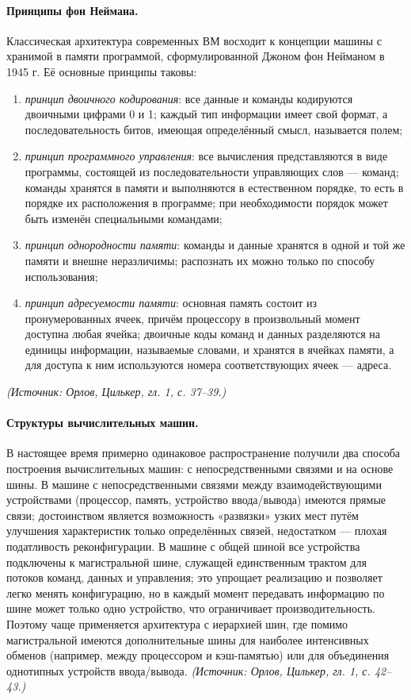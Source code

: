 \documentclass[a4paper,12pt]{article}
\begin{document}
\paragraph{Принципы фон Неймана.}
Классическая архитектура современных ВМ восходит к концепции машины с хранимой в памяти программой, сформулированной Джоном фон Нейманом в 1945 г. Её основные принципы таковы:
\begin{enumerate}[label=\arabic*)]
\item \emph{принцип двоичного кодирования}: все данные и команды кодируются двоичными цифрами 0 и 1; каждый тип информации имеет свой формат, а последовательность битов, имеющая определённый смысл, называется полем;
\item \emph{принцип программного управления}: все вычисления представляются в виде программы, состоящей из последовательности управляющих слов --- команд; команды хранятся в памяти и выполняются в естественном порядке, то есть в порядке их расположения в программе; при необходимости порядок может быть изменён специальными командами;
\item \emph{принцип однородности памяти}: команды и данные хранятся в одной и той же памяти и внешне неразличимы; распознать их можно только по способу использования;
\item \emph{принцип адресуемости памяти}: основная память состоит из пронумерованных ячеек, причём процессору в произвольный момент доступна любая ячейка; двоичные коды команд и данных разделяются на единицы информации, называемые словами, и хранятся в ячейках памяти, а для доступа к ним используются номера соответствующих ячеек --- адреса.
\end{enumerate}
\textit{(Источник: Орлов, Цилькер, гл. 1, с. 37--39.)}

\paragraph{Структуры вычислительных машин.}
В настоящее время примерно одинаковое распространение получили два способа построения вычислительных машин: с непосредственными связями и на основе шины. В машине с непосредственными связями между взаимодействующими устройствами (процессор, память, устройство ввода/вывода) имеются прямые связи; достоинством является возможность «развязки» узких мест путём улучшения характеристик только определённых связей, недостатком --- плохая податливость реконфигурации. В машине с общей шиной все устройства подключены к магистральной шине, служащей единственным трактом для потоков команд, данных и управления; это упрощает реализацию и позволяет легко менять конфигурацию, но в каждый момент передавать информацию по шине может только одно устройство, что ограничивает производительность. Поэтому чаще применяется архитектура с иерархией шин, где помимо магистральной имеются дополнительные шины для наиболее интенсивных обменов (например, между процессором и кэш-памятью) или для объединения однотипных устройств ввода/вывода.
\textit{(Источник: Орлов, Цилькер, гл. 1, с. 42--43.)}
\end{document}
